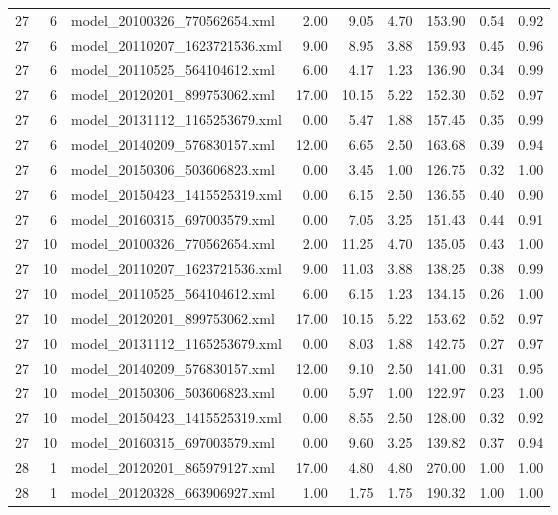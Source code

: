 \begin{table}[ht]
\begin{tabular}{rrlrrrrrr}
   27 &   6 & model\_20100326\_770562654.xml & 2.00 & 9.05 & 4.70 & 153.90 & 0.54 & 0.92 \\ 
   27 &   6 & model\_20110207\_1623721536.xml & 9.00 & 8.95 & 3.88 & 159.93 & 0.45 & 0.96 \\ 
   27 &   6 & model\_20110525\_564104612.xml & 6.00 & 4.17 & 1.23 & 136.90 & 0.34 & 0.99 \\ 
   27 &   6 & model\_20120201\_899753062.xml & 17.00 & 10.15 & 5.22 & 152.30 & 0.52 & 0.97 \\ 
   27 &   6 & model\_20131112\_1165253679.xml & 0.00 & 5.47 & 1.88 & 157.45 & 0.35 & 0.99 \\ 
   27 &   6 & model\_20140209\_576830157.xml & 12.00 & 6.65 & 2.50 & 163.68 & 0.39 & 0.94 \\ 
   27 &   6 & model\_20150306\_503606823.xml & 0.00 & 3.45 & 1.00 & 126.75 & 0.32 & 1.00 \\ 
   27 &   6 & model\_20150423\_1415525319.xml & 0.00 & 6.15 & 2.50 & 136.55 & 0.40 & 0.90 \\ 
   27 &   6 & model\_20160315\_697003579.xml & 0.00 & 7.05 & 3.25 & 151.43 & 0.44 & 0.91 \\ 
   27 &  10 & model\_20100326\_770562654.xml & 2.00 & 11.25 & 4.70 & 135.05 & 0.43 & 1.00 \\ 
   27 &  10 & model\_20110207\_1623721536.xml & 9.00 & 11.03 & 3.88 & 138.25 & 0.38 & 0.99 \\ 
   27 &  10 & model\_20110525\_564104612.xml & 6.00 & 6.15 & 1.23 & 134.15 & 0.26 & 1.00 \\ 
   27 &  10 & model\_20120201\_899753062.xml & 17.00 & 10.15 & 5.22 & 153.62 & 0.52 & 0.97 \\ 
   27 &  10 & model\_20131112\_1165253679.xml & 0.00 & 8.03 & 1.88 & 142.75 & 0.27 & 0.97 \\ 
   27 &  10 & model\_20140209\_576830157.xml & 12.00 & 9.10 & 2.50 & 141.00 & 0.31 & 0.95 \\ 
   27 &  10 & model\_20150306\_503606823.xml & 0.00 & 5.97 & 1.00 & 122.97 & 0.23 & 1.00 \\ 
   27 &  10 & model\_20150423\_1415525319.xml & 0.00 & 8.55 & 2.50 & 128.00 & 0.32 & 0.92 \\ 
   27 &  10 & model\_20160315\_697003579.xml & 0.00 & 9.60 & 3.25 & 139.82 & 0.37 & 0.94 \\ 
   28 &   1 & model\_20120201\_865979127.xml & 17.00 & 4.80 & 4.80 & 270.00 & 1.00 & 1.00 \\ 
   28 &   1 & model\_20120328\_663906927.xml & 1.00 & 1.75 & 1.75 & 190.32 & 1.00 & 1.00 \\ 

\end{tabular}
\end{table}

